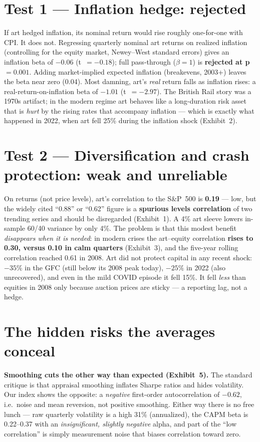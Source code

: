 \documentclass[11pt]{article}
\begin{document}
\section{Test 1 --- Inflation hedge: rejected}
If art hedged inflation, its nominal return would rise roughly one-for-one with CPI. It does not.
Regressing quarterly nominal art returns on realized inflation (controlling for the equity market,
Newey--West standard errors) gives an inflation beta of \textbf{$-0.06$} (t~$=-0.18$); full pass-through
($\beta=1$) is \textbf{rejected at p~$=0.001$}. Adding market-implied expected inflation (breakevens,
2003+) leaves the beta near zero (0.04). Most damning, art's \emph{real} return falls as inflation
rises: a real-return-on-inflation beta of \textbf{$-1.01$} (t~$=-2.97$). The British Rail story was a
1970s artifact; in the modern regime art behaves like a long-duration risk asset that is \emph{hurt}
by the rising rates that accompany inflation --- which is exactly what happened in 2022, when art fell
25\% during the inflation shock (Exhibit~2).

\section{Test 2 --- Diversification and crash protection: weak and unreliable}
On returns (not price levels), art's correlation to the S\&P~500 is \textbf{0.19} --- low, but the
widely cited ``0.88'' or ``0.62'' figure is a \textbf{spurious levels correlation} of two trending
series and should be disregarded (Exhibit~1). A 4\% art sleeve lowers in-sample 60/40 variance by only
4\%. The problem is that this modest benefit \emph{disappears when it is needed}: in modern crises the
art--equity correlation \textbf{rises to 0.30, versus 0.10 in calm quarters} (Exhibit~3), and the
five-year rolling correlation reached 0.61 in 2008. Art did not protect capital in any recent shock:
$-35\%$ in the GFC (still below its 2008 peak today), $-25\%$ in 2022 (also unrecovered), and even in
the mild COVID episode it fell 15\%. It fell \emph{less} than equities in 2008 only because auction
prices are sticky --- a reporting lag, not a hedge.

\section{The hidden risks the averages conceal}
\textbf{Smoothing cuts the other way than expected (Exhibit~5).} The standard critique is that
appraisal smoothing inflates Sharpe ratios and hides volatility. Our index shows the opposite: a
\emph{negative} first-order autocorrelation of $-0.62$, i.e.\ noise and mean reversion, not positive
smoothing. Either way there is no free lunch --- raw quarterly volatility is a high 31\% (annualized),
the CAPM beta is 0.22--0.37 with an \emph{insignificant, slightly negative} alpha, and part of the
``low correlation'' is simply measurement noise that biases correlation toward zero.
\end{document}
